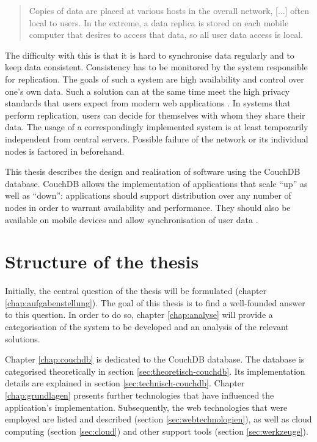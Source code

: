 \begin{quote}
Copies of data are placed at various hosts in the overall network, [...] often local to users. In the extreme, a data replica is stored on each mobile computer that desires to access that data, so all user data access is local.
\end{quote}

The difficulty with this is that it is hard to synchronise data regularly and to keep data consistent. Consistency has to be monitored by the system responsible for replication. The goals of such a system are high availability and control over one's own data. Such a solution can at the same time meet the high privacy standards that users expect from modern web applications . In systems that perform replication, users can decide for themselves with whom they share their data. The usage of a correspondingly implemented system is at least temporarily independent from central servers. Possible failure of the network or its individual nodes is factored in beforehand.

This thesis describes the design and realisation of software using the CouchDB database. CouchDB allows the implementation of applications that scale \enquote{up} as well as \enquote{down}: applications should support distribution over any number of nodes in order to warrant availability and performance. They should also be available on mobile devices and allow synchronisation of user data .

\section{Structure of the thesis}

Initially, the central question of the thesis will be formulated (chapter \ref{chap:aufgabenstellung}). The goal of this thesis is to find a well-founded answer to this question. In order to do so, chapter \ref{chap:analyse} will provide a categorisation of the system to be developed and an analysis of the relevant solutions.

Chapter \ref{chap:couchdb} is dedicated to the CouchDB database. The database is categorised theoretically in section \ref{sec:theoretisch-couchdb}. Its implementation details are explained in section \ref{sec:technisch-couchdb}. Chapter \ref{chap:grundlagen} presents further technologies that have influenced the application's implementation. Subsequently, the web technologies that were employed are listed and described (section \ref{sec:webtechnologien}), as well as cloud computing (section \ref{sec:cloud}) and other support tools (section \ref{sec:werkzeuge}).

